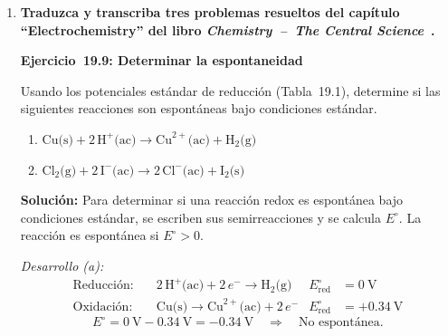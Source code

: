 \documentclass[12pt]{article}
\begin{document}
\begin{enumerate}[label=\textbf{\alph*)}, leftmargin=1.2cm]
    \vspace{0.4cm}
    \noindent\textbf{Celdas de combustible}

    Las celdas de combustible convierten directamente energía química de
    $\text{H}_2$ y $\text{O}_2$ en electricidad sin combustión. En la celda de
    membrana de intercambio protónico (PEM), el $\text{H}_2$ se oxida en el
    ánodo liberando electrones que viajan por un circuito externo, mientras los
    protones atraviesan la membrana y se combinan con $\text{O}_2$ en el cátodo
    para formar agua. Son eficientes, limpias y se usan en vehículos de
    hidrógeno y aplicaciones estacionarias~\cite{rozo2007,huazhong}.

    \item \textbf{Traduzca y transcriba tres problemas resueltos del capítulo
          ``Electrochemistry'' del libro \textit{Chemistry~--~The Central
          Science}~\cite{brown2014}.}

    \vspace{0.4cm}
    \noindent\textbf{Ejercicio~19.9: Determinar la espontaneidad}

    Usando los potenciales estándar de reducción (Tabla~19.1), determine si
    las siguientes reacciones son espontáneas bajo condiciones estándar.

    \begin{enumerate}[label=(\alph*)]
        \item $\text{Cu(s)} + 2\,\text{H}^+\text{(ac)}
               \rightarrow \text{Cu}^{2+}\text{(ac)} + \text{H}_2\text{(g)}$
        \item $\text{Cl}_2\text{(g)} + 2\,\text{I}^-\text{(ac)}
               \rightarrow 2\,\text{Cl}^-\text{(ac)} + \text{I}_2\text{(s)}$
    \end{enumerate}

    \textbf{Solución:} Para determinar si una reacción redox es espontánea
    bajo condiciones estándar, se escriben sus semirreacciones y se calcula
    $E^\circ$. La reacción es espontánea si $E^\circ > 0$.

    \textit{Desarrollo (a):}
    \begin{align*}
        \text{Reducción:} &\quad
          2\,\text{H}^+\text{(ac)} + 2\,e^- \to \text{H}_2\text{(g)}
          & E^\circ_\text{red} &= 0\ \text{V} \\
        \text{Oxidación:} &\quad
          \text{Cu(s)} \to \text{Cu}^{2+}\text{(ac)} + 2\,e^-
          & E^\circ_\text{red} &= +0.34\ \text{V}
    \end{align*}
    \[
        E^\circ = 0\ \text{V} - 0.34\ \text{V} = -0.34\ \text{V}
        \quad \Rightarrow \quad \text{No espontánea.}
    \]


\end{enumerate}
\end{document}
